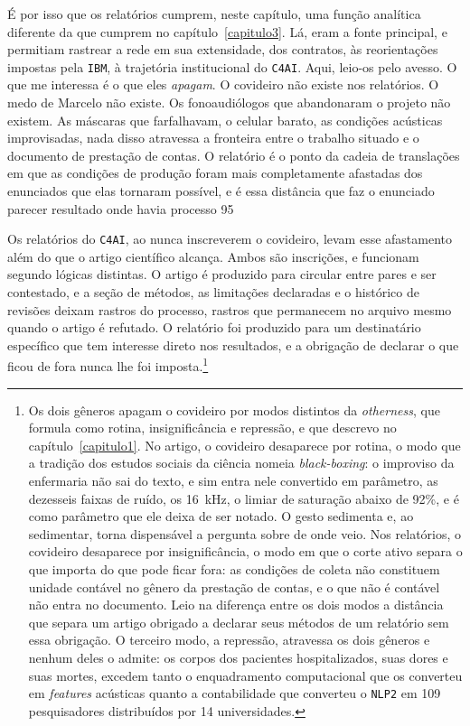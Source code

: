 É por isso que os relatórios cumprem, neste capítulo, uma função analítica diferente da que cumprem no capítulo~\ref{capitulo3}. Lá, eram a fonte principal, e permitiam rastrear a rede em sua extensidade, dos contratos, às reorientações impostas pela \texttt{IBM}, à trajetória institucional do \texttt{C4AI}. Aqui, leio-os pelo avesso. O que me interessa é o que eles \textit{apagam}. O covideiro não existe nos relatórios. O medo de Marcelo não existe. Os fonoaudiólogos que abandonaram o projeto não existem. As máscaras que farfalhavam, o celular barato, as condições acústicas improvisadas, nada disso atravessa a fronteira entre o trabalho situado e o documento de prestação de contas. O relatório é o ponto da cadeia de translações em que as condições de produção foram mais completamente afastadas dos enunciados que elas tornaram possível, e é essa distância que faz o enunciado parecer resultado onde havia processo \parencite{Latour2011CienciaEmAcao}95


Os relatórios do \texttt{C4AI}, ao nunca inscreverem o covideiro, levam esse afastamento além do que o artigo científico alcança. Ambos são inscrições, e funcionam segundo lógicas distintas. O artigo é produzido para circular entre pares e ser contestado, e a seção de métodos, as limitações declaradas e o histórico de revisões deixam rastros do processo, rastros que permanecem no arquivo mesmo quando o artigo é refutado. O relatório foi produzido para um destinatário específico que tem interesse direto nos resultados, e a obrigação de declarar o que ficou de fora nunca lhe foi imposta.\footnote{Os dois gêneros apagam o covideiro por modos distintos da \textit{otherness}, que \textcite[p.~84]{Law2004After} formula como rotina, insignificância e repressão, e que descrevo no capítulo~\ref{capitulo1}. No artigo, o covideiro desaparece por rotina, o modo que a tradição dos estudos sociais da ciência nomeia \textit{black-boxing}: o improviso da enfermaria não sai do texto, e sim entra nele convertido em parâmetro, as dezesseis faixas de ruído, os 16~kHz, o limiar de saturação abaixo de 92\%, e é como parâmetro que ele deixa de ser notado. O gesto sedimenta e, ao sedimentar, torna dispensável a pergunta sobre de onde veio. Nos relatórios, o covideiro desaparece por insignificância, o modo em que o corte ativo separa o que importa do que pode ficar fora: as condições de coleta não constituem unidade contável no gênero da prestação de contas, e o que não é contável não entra no documento. Leio na diferença entre os dois modos a distância que separa um artigo obrigado a declarar seus métodos de um relatório sem essa obrigação. O terceiro modo, a repressão, atravessa os dois gêneros e nenhum deles o admite: os corpos dos pacientes hospitalizados, suas dores e suas mortes, excedem tanto o enquadramento computacional que os converteu em \textit{features} acústicas quanto a contabilidade que converteu o \texttt{NLP2} em 109 pesquisadores distribuídos por 14 universidades.}

